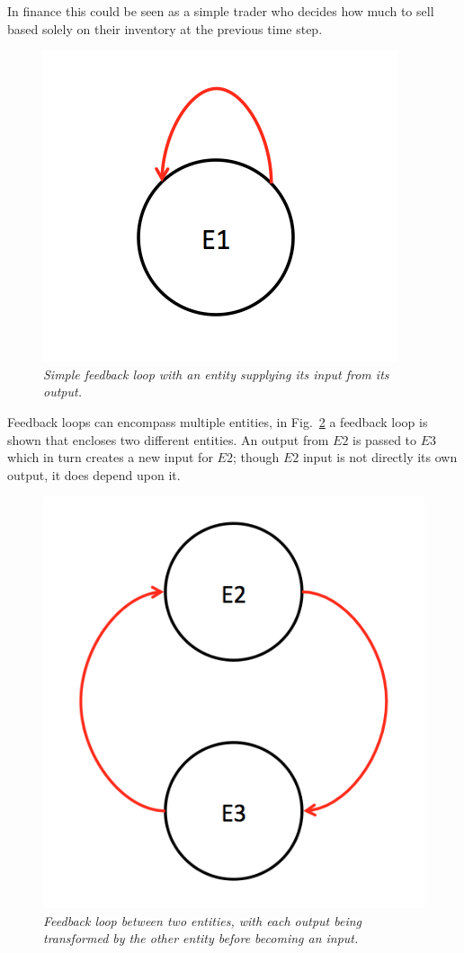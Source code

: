 \documentclass{article}
\begin{document}
In finance this could be seen as a simple trader who decides how much to sell based solely on their inventory at the previous time step. 
\begin{figure}[H]
	\centering
	\includegraphics[scale=0.5]{selffeedback}
	\caption{\it Simple feedback loop with an entity supplying its input from its output.}
	\label{fig:exampleselffeedback}
\end{figure} 
Feedback loops can encompass multiple entities, in Fig.~\ref{fig:exampletwofeedback} a feedback loop is shown that encloses two different entities. An output from $E2$ is passed to $E3$ which in turn creates a new input for $E2$; though $E2$ input is not directly its own output, it does depend upon it. 
\begin{figure}[H]
	\centering
	\includegraphics[scale=0.5]{twofeedback}
	\caption{\it Feedback loop between two entities, with each output being transformed by the other entity before becoming an input.}
	\label{fig:exampletwofeedback}
\end{figure} 
\end{document}
